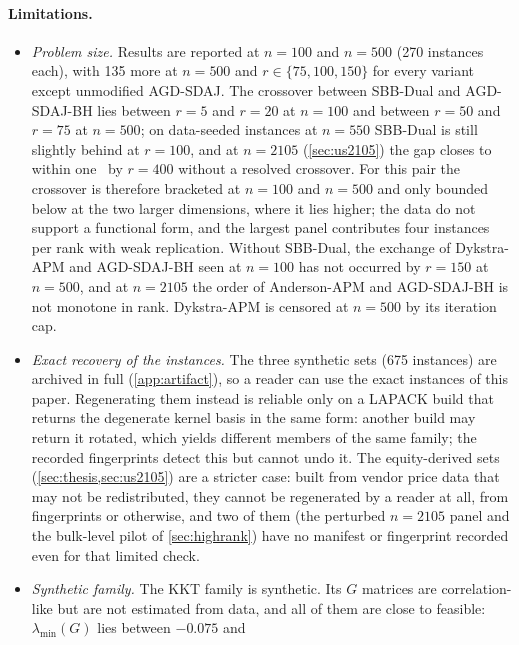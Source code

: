 \paragraph{Limitations.}
\begin{itemize}
  \item \emph{Problem size.} Results are reported at $n=100$ and $n=500$
    (270 instances each), with 135 more at $n=500$ and $r\in\{75,100,150\}$
    for every variant except unmodified AGD-SDAJ. The crossover between
    SBB-Dual and AGD-SDAJ-BH
    lies between $r=5$ and $r=20$ at $n=100$ and between $r=50$ and $r=75$
    at $n=500$; on data-seeded instances at $n=550$ SBB-Dual is still slightly
    behind at $r=100$, and at $n=2105$ (\cref{sec:us2105}) the gap closes to
    within one \EVD\ by $r=400$ without a resolved crossover. For this pair
    the crossover is therefore bracketed at $n=100$ and $n=500$ and only
    bounded below at the two larger dimensions, where it lies higher; the
    data do not support a functional form, and the largest panel contributes
    four instances per rank with weak replication. Without SBB-Dual, the
    exchange of Dykstra-APM and AGD-SDAJ-BH seen at $n=100$ has not occurred
    by $r=150$ at $n=500$, and at $n=2105$ the order
    of Anderson-APM and AGD-SDAJ-BH is not monotone in rank.
    Dykstra-APM is censored at $n=500$ by its iteration cap.
  \item \emph{Exact recovery of the instances.} The three synthetic sets
    (675 instances) are archived in full (\cref{app:artifact}), so a reader
    can use the exact instances of this paper. Regenerating them instead is
    reliable only on a LAPACK build that returns the degenerate kernel basis
    in the same form: another build may return it rotated, which yields
    different members of the same family; the recorded fingerprints detect
    this but cannot undo it.
    The equity-derived sets (\cref{sec:thesis,sec:us2105}) are a stricter
    case: built from vendor price data that may not be redistributed, they
    cannot be regenerated by a reader at all, from fingerprints or otherwise,
    and two of them (the perturbed $n=2105$ panel and the bulk-level pilot of
    \cref{sec:highrank}) have no manifest or fingerprint recorded even for
    that limited check.
  \item \emph{Synthetic family.} The KKT family is synthetic. Its $G$
    matrices are correlation-like but are not estimated from data, and all of
    them are close to feasible: $\lambda_{\min}(G)$ lies between $-0.075$ and

\end{itemize}
